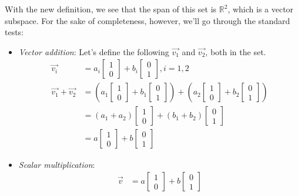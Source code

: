 \begin{enumerate}
{    With the new definition, we see that the span of this set is $\mathbb{R}^2$, which is a vector subspace. For the sake of completeness, however, we'll go through the standard tests:
    \begin{itemize}
        \item \textit{Vector addition}: Let's define the following $\vec{v_1}$ and $\vec{v_2}$, both in the set.
        \begin{align*}
            \vec{v_i} &= a_i\begin{bmatrix}1\\0\end{bmatrix} + b_i\begin{bmatrix}0\\1\end{bmatrix}, i=1, 2\\
            \vec{v_1} + \vec{v_2} &= \left(a_1\begin{bmatrix}1\\0\end{bmatrix} + b_1\begin{bmatrix}0\\1\end{bmatrix}\right) + \left(a_2\begin{bmatrix}1\\0\end{bmatrix} + b_2\begin{bmatrix}0\\1\end{bmatrix}\right)\\
                &= \left(a_1 + a_2\right)\begin{bmatrix}1\\0\end{bmatrix} + \left(b_1 + b_2\right)\begin{bmatrix}0\\1\end{bmatrix}\\
                &= a\begin{bmatrix}1\\0\end{bmatrix} + b\begin{bmatrix}0\\1\end{bmatrix}
        \end{align*}
        \item \textit{Scalar multiplication}:
        \begin{align*}
            \vec{v} &= a\begin{bmatrix}1\\0\end{bmatrix} + b\begin{bmatrix}0\\1\end{bmatrix}\\

\end{align*}
\end{itemize}}
\end{enumerate}
